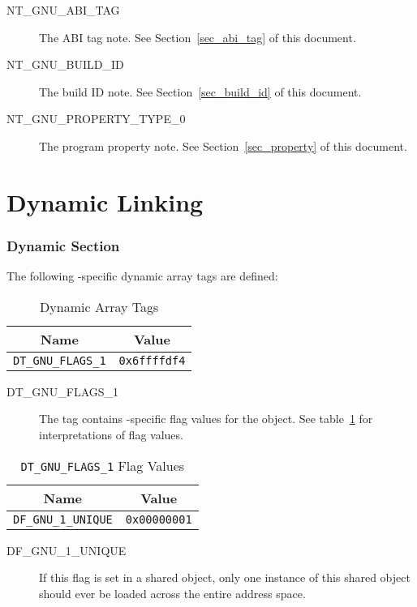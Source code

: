 \begin{description}
 \item[NT_GNU_ABI_TAG]
   The ABI tag note.  See Section~\ref{sec_abi_tag} of this document.
 \item[NT_GNU_BUILD_ID]
   The build ID note.  See Section~\ref{sec_build_id} of this document.
 \item[NT_GNU_PROPERTY_TYPE_0]
   The program property note.  See Section~\ref{sec_property} of this
   document.
\end{description}

\section{Dynamic Linking}

\subsubsection{Dynamic Section}

The following \xOS-specific dynamic array tags are defined:

\begin{table}[H]
\Hrule
  \caption{Dynamic Array Tags}
  \begin{center}
    \begin{tabular}[t]{l|l}
      \multicolumn{1}{c}{Name} & \multicolumn{1}{c}{Value} \\
      \hline
      \texttt{DT_GNU_FLAGS_1} & \texttt{0x6ffffdf4} \\
    \end{tabular}
  \end{center}
\Hrule
\end{table}

\begin{description}
 \item[DT_GNU_FLAGS_1]
      The tag contains \xOS-specific flag values for the object.  See
      table~\ref{dt_gnu_1_unique} for interpretations of flag values.
\end{description}

\begin{table}[H]
\Hrule
  \caption{\texttt{DT_GNU_FLAGS_1} Flag Values}
  \label{dt_gnu_1_unique}
  \begin{center}
    \begin{tabular}[t]{l|l}
      \multicolumn{1}{c}{Name} & \multicolumn{1}{c}{Value} \\
      \hline
      \texttt{DF_GNU_1_UNIQUE} & \texttt{0x00000001} \\
    \end{tabular}
  \end{center}
\Hrule
\end{table}

\begin{description}
 \item[DF_GNU_1_UNIQUE]
      If this flag is set in a shared object, only one instance of this
      shared object should ever be loaded across the entire address
      space.
\end{description}

